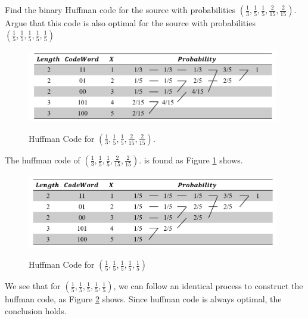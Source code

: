 \begin{exercise}{Find the binary Huffman code for the source with probabilities $\left(\frac{1}{3}, \frac{1}{5}, \frac{1}{5}, \frac{2}{15}, \frac{2}{15}\right) .$ Argue that this code is also optimal for the source with probabilities $\left(\frac{1}{5}, \frac{1}{5}, \frac{1}{5}, \frac{1}{5}, \frac{1}{5}\right)$}
  \begin{solution}
    \begin{figure}[H]
      \caption{Huffman Code for $\left(\frac{1}{3}, \frac{1}{5}, \frac{1}{5}, \frac{2}{15}, \frac{2}{15}\right) .$}
      \centering
      \includegraphics[width=11cm]{img/5-1.png}
      \label{fig:ex5-4}
    \end{figure}
    The huffman code of  $\left(\frac{1}{3}, \frac{1}{5}, \frac{1}{5}, \frac{2}{15}, \frac{2}{15}\right) .$ is found as Figure \ref{fig:ex5-4} shows. 

      \begin{figure}[H]
        \caption{Huffman Code for $\left(\frac{1}{5}, \frac{1}{5}, \frac{1}{5}, \frac{1}{5}, \frac{1}{5}\right)$}
        \centering
        \includegraphics[width=11cm]{img/5-2.png}
        \label{fig:ex5-5}
      \end{figure}
    We see that for $\left(\frac{1}{5}, \frac{1}{5}, \frac{1}{5}, \frac{1}{5}, \frac{1}{5}\right)$, we can follow an identical process to construct the huffman code, as Figure \ref{fig:ex5-5} shows. Since huffman code is always optimal, the conclusion holds.
  \end{solution}
  \label{ex5-4}
\end{exercise}


